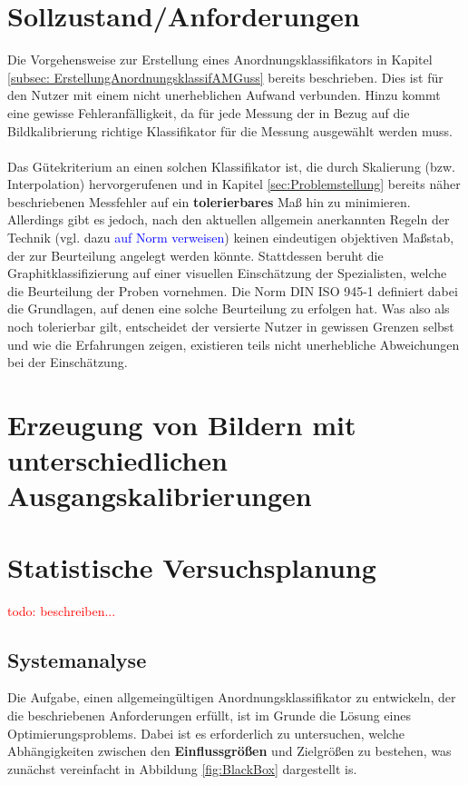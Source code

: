\documentclass[
fontsize=10pt, 
listof = totoc,
parskip = half	
]{report}
\begin{document}
\section{Sollzustand/Anforderungen}
\label{sec:DefAnforderungenAnordnKlas}
Die Vorgehensweise zur Erstellung eines Anordnungsklassifikators in Kapitel \ref{subsec: ErstellungAnordnungsklassifAMGuss} bereits beschrieben. Dies ist für den Nutzer mit einem nicht unerheblichen Aufwand verbunden. Hinzu kommt eine gewisse Fehleranfälligkeit, da für jede Messung der in Bezug auf die Bildkalibrierung richtige Klassifikator für die Messung ausgewählt werden muss.
\\\\
Das Gütekriterium an einen solchen Klassifikator ist, die durch Skalierung (bzw. Interpolation) hervorgerufenen und in Kapitel \ref{sec:Problemstellung} bereits näher beschriebenen Messfehler auf ein \textbf{tolerierbares} Maß hin zu minimieren. Allerdings gibt es jedoch, nach den aktuellen allgemein anerkannten Regeln der Technik (vgl. dazu \textcolor{blue}{auf Norm verweisen}) keinen eindeutigen objektiven Maßstab, der zur Beurteilung angelegt werden könnte. Stattdessen beruht die Graphitklassifizierung auf einer visuellen Einschätzung der Spezialisten, welche die Beurteilung der Proben vornehmen. Die Norm DIN ISO 945-1 definiert dabei die Grundlagen, auf denen eine solche Beurteilung zu erfolgen hat. Was also als noch tolerierbar gilt, entscheidet der versierte Nutzer in gewissen Grenzen selbst und wie die Erfahrungen zeigen, existieren teils nicht unerhebliche Abweichungen bei der Einschätzung. 

\section{Erzeugung von Bildern mit unterschiedlichen Ausgangskalibrierungen}


\section{Statistische Versuchsplanung}


\noindent\textcolor{red}{todo:  beschreiben...}  

\subsection{Systemanalyse}
Die Aufgabe, einen allgemeingültigen Anordnungsklassifikator zu entwickeln, der die beschriebenen Anforderungen erfüllt, ist im Grunde die Lösung eines Optimierungsproblems. Dabei ist es erforderlich zu untersuchen, welche Abhängigkeiten zwischen den \textbf{Einflussgrößen} und Zielgrößen zu bestehen, was zunächst vereinfacht in Abbildung \ref{fig:BlackBox} dargestellt is.
\end{document}
